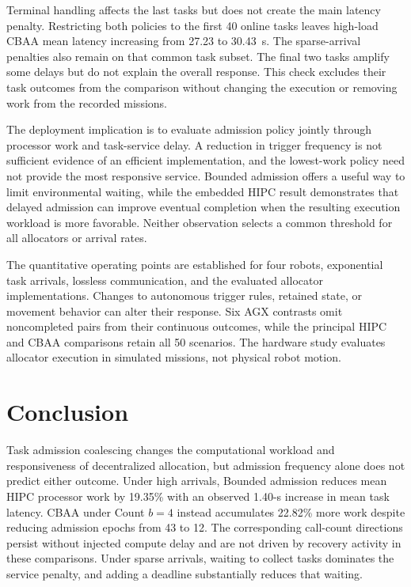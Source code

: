 \documentclass[conference]{IEEEtran}
\begin{document}
Terminal handling affects the last tasks but does not create the main latency penalty. Restricting both policies to the first 40 online tasks leaves high-load CBAA mean latency increasing from 27.23 to 30.43~s. The sparse-arrival penalties also remain on that common task subset. The final two tasks amplify some delays but do not explain the overall response. This check excludes their task outcomes from the comparison without changing the execution or removing work from the recorded missions.

The deployment implication is to evaluate admission policy jointly through processor work and task-service delay. A reduction in trigger frequency is not sufficient evidence of an efficient implementation, and the lowest-work policy need not provide the most responsive service. Bounded admission offers a useful way to limit environmental waiting, while the embedded HIPC result demonstrates that delayed admission can improve eventual completion when the resulting execution workload is more favorable. Neither observation selects a common threshold for all allocators or arrival rates.

The quantitative operating points are established for four robots, exponential task arrivals, lossless communication, and the evaluated allocator implementations. Changes to autonomous trigger rules, retained state, or movement behavior can alter their response. Six AGX contrasts omit noncompleted pairs from their continuous outcomes, while the principal HIPC and CBAA comparisons retain all 50 scenarios. The hardware study evaluates allocator execution in simulated missions, not physical robot motion.

\section{Conclusion}
\label{sec:conclusion}
Task admission coalescing changes the computational workload and responsiveness of decentralized allocation, but admission frequency alone does not predict either outcome. Under high arrivals, Bounded admission reduces mean HIPC processor work by 19.35\% with an observed 1.40-s increase in mean task latency. CBAA under Count $b=4$ instead accumulates 22.82\% more work despite reducing admission epochs from 43 to 12. The corresponding call-count directions persist without injected compute delay and are not driven by recovery activity in these comparisons. Under sparse arrivals, waiting to collect tasks dominates the service penalty, and adding a deadline substantially reduces that waiting.
\end{document}
